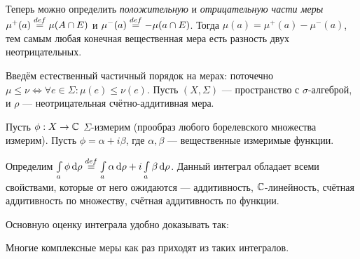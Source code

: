 \documentclass[a4paper]{report}
\begin{document}
    Теперь можно определить \emph{положительную} и \emph{отрицательную части меры} $\mu^+(a) \overset{def}{=} \mu(A \cap E)$ и $\mu^-(a) \overset{def}{=} -\mu(a \cap E)$.
    Тогда $\mu(a) = \mu^{+}(a) - \mu^-(a)$, тем самым любая конечная вещественная мера есть разность двух неотрицательных.

    Введём естественный частичный порядок на мерах: поточечно $\mu \le \nu \iff \forall e \in \Sigma: \mu(e) \le \nu(e)$.
    Пусть $(X, \Sigma)$ --- пространство с $\sigma$-алгеброй, и $\rho$ --- неотрицательная счётно-аддитивная мера.

    Пусть $\phi: X \rightarrow \mathbb{C}$ $\Sigma$-измерим (прообраз любого борелевского множества измерим).
    Пусть $\phi = \alpha + i\beta$, где $\alpha, \beta$ --- вещественные измеримые функции.

    Определим $\int\limits_{a}\phi \operatorname{d}\!\rho \overset{def}{=} \int\limits_{a}\alpha\operatorname{d}\!\rho + i\int\limits_{a}\beta\operatorname{d}\!\rho$.
    Данный интеграл обладает всеми свойствами, которые от него ожидаются --- аддитивность, $\mathbb{C}$-линейность, счётная аддитивность по множеству, счётная аддитивность по функции.

    Основную оценку интеграла удобно доказывать так:

    Многие комплексные меры как раз приходят из таких интегралов.
\end{document}
